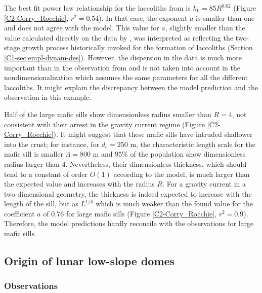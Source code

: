 The  best  fit   power  law  relationship  for   the  laccoliths  from
\citet{E:2015tl}     is     $h_0     =    85     R^{0.62}$     (Figure
\ref{C2-Corry_Rocchie}, $r^2  =0.54$). In that case,  the exponent $a$
is smaller than one and does not agree with the model.  This value for
$a$, slightly smaller  than the value calculated directly  on the data
by  \citet{McCaffrey:1997ea},   was  interpreted  as   reflecting  the
two-stage  growth process  historically invoked  for the  formation of
laccoliths   (Section   \ref{C1-sec:empl-dynam-des}).   However,   the
dispersion in the data is much  more important than in the observation
from  \citet{Rocchi:2010dn}  and is  not  taken  into account  in  the
nondimensionalization which  assumes the  same parameters for  all the
different  laccoliths. It  might explain  the discrepancy  between the
model prediction and the observation in this example.

Half of the  large mafic sills show dimensionless  radius smaller than
$R=4$, not consistent with their  arrest in the gravity current regime
(Figure \ref{C2-Corry_Rocchie}).   It might  suggest that  these mafic
sills  have  intruded shallower  into  the  crust; for  instance,  for
$d_c=250$ m,  the characteristic  length scale for  the mafic  sill is
smaller   $\Lambda=800$  m   and   $95\%$  of   the  population   show
dimensionless   radius   larger   than   $4$.    Nevertheless,   their
dimensionless  thickness, which  should tend  to a  constant of  order
$O(1)$ according to the model, is  much larger than the expected value
and increases  with the radius  $R$.  For a  gravity current in  a two
dimensional  geometry, the  thickness is  indeed expected  to increase
with the length  of the sill, but  as $L^{1/4}$ \citet{Michaut:2011kg}
which is much  weaker than the found value for  the coefficient $a$ of
$0.76$   for  large   mafic   sills  (Figure   \ref{C2-Corry_Rocchie},
$r^2=0.9$).  Therefore,  the model  predictions hardly  reconcile with
the observations for large mafic sills.


\subsection{Origin of lunar low-slope domes}
\label{C2-sec:observ-vs-pred}

\subsubsection*{Observations}

